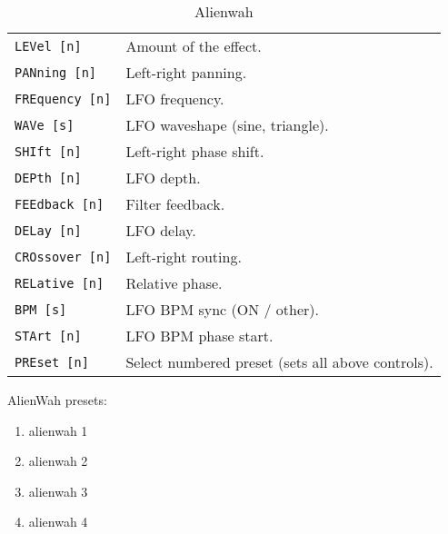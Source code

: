    \begin{table}[H]
      \centering
      \caption{Alienwah}
      \begin{tabular}{l l}
\texttt{LEVel [n]} &
   Amount of the effect. \\
\texttt{PANning [n]} &
   Left-right panning. \\
\texttt{FREquency [n]} &
   LFO frequency. \\
\texttt{WAVe [s]} &
   LFO waveshape (sine, triangle). \\
\texttt{SHIft [n]} &
   Left-right phase shift. \\
\texttt{DEPth [n]} &
   LFO depth. \\
\texttt{FEEdback [n]} &
   Filter feedback. \\
\texttt{DELay [n]} &
   LFO delay. \\
\texttt{CROssover [n]} &
   Left-right routing. \\
\texttt{RELative [n]} &
   Relative phase. \\
\texttt{BPM [s]} &
   LFO BPM sync (ON / other). \\
\texttt{STArt [n]} &
   LFO BPM phase start. \\
\texttt{PREset [n]} &
   Select numbered preset (sets all above controls). \\
      \end{tabular}
   \end{table}
AlienWah presets:
   \begin{enumerate}
   \item alienwah 1
   \item alienwah 2
   \item alienwah 3
   \item alienwah 4
   \end{enumerate}


